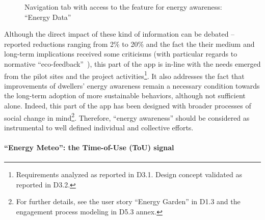 \begin{figure}[htb]
\centering
{}
\caption{Navigation tab with access to the feature for energy awareness: ``Energy Data''}\label{fig:tab}
\end{figure}

Although the direct impact of these kind of information can be debated -- reported reductions ranging from 2\% to 20\% \citep{eea_report} and the fact the their medium and
long-term implications received some criticisms (with particular regards to normative ``eco-feedback''~\citep{Strengers2012,Cakici2014}), this part of the app is in-line with the needs emerged from
the pilot sites and the project activities\footnote{Requirements analyzed as reported in D3.1. Design concept validated as reported in D3.2.}.
It also addresses the fact that improvements of dwellers' energy awareness remain a necessary condition towards the long-term adoption of more sustainable behaviors,
although not sufficient alone. Indeed, this part of the app has been designed with broader processes of social change
in mind\footnote{For further details, see the user story ``Energy Garden'' in D1.3 and  the engagement process modeling in D5.3 annex.}. Therefore, ``energy awareness'' should be considered as instrumental to
well defined individual and collective efforts. 


\paragraph{``Energy Meteo'': the Time-of-Use (ToU) signal} 

